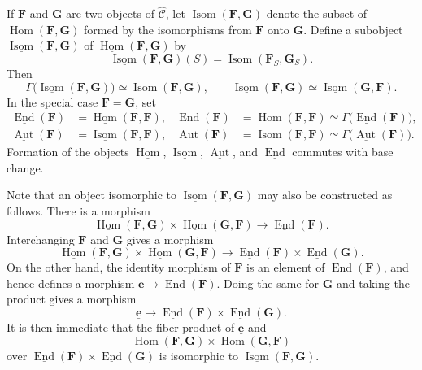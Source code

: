 If \(\mathbf F\) and \(\mathbf G\) are two objects of
\(\widehat{\mathscr C}\), let \(\operatorname{Isom}(\mathbf F,\mathbf G)\)
denote the subset of \(\operatorname{Hom}(\mathbf F,\mathbf G)\) formed by
the isomorphisms from \(\mathbf F\) onto \(\mathbf G\). Define a subobject
\(\underline{\operatorname{Isom}}(\mathbf F,\mathbf G)\) of
\(\underline{\operatorname{Hom}}(\mathbf F,\mathbf G)\) by
\[
  \underline{\operatorname{Isom}}(\mathbf F,\mathbf G)(S)
    =\operatorname{Isom}(\mathbf F_S,\mathbf G_S).
\]
Then
\[
  \Gamma\bigl(\underline{\operatorname{Isom}}
    (\mathbf F,\mathbf G)\bigr)
    \simeq\operatorname{Isom}(\mathbf F,\mathbf G),
  \qquad
  \underline{\operatorname{Isom}}(\mathbf F,\mathbf G)
    \simeq
  \underline{\operatorname{Isom}}(\mathbf G,\mathbf F).
\]
In the special case \(\mathbf F=\mathbf G\), set
\begin{align*}
  \underline{\operatorname{End}}(\mathbf F)
    &=\underline{\operatorname{Hom}}(\mathbf F,\mathbf F),
  &
  \operatorname{End}(\mathbf F)
    &=\operatorname{Hom}(\mathbf F,\mathbf F)
      \simeq\Gamma\bigl(\underline{\operatorname{End}}(\mathbf F)\bigr),\\
  \underline{\operatorname{Aut}}(\mathbf F)
    &=\underline{\operatorname{Isom}}(\mathbf F,\mathbf F),
  &
  \operatorname{Aut}(\mathbf F)
    &=\operatorname{Isom}(\mathbf F,\mathbf F)
      \simeq\Gamma\bigl(\underline{\operatorname{Aut}}(\mathbf F)\bigr).
\end{align*}
Formation of the objects
\(\underline{\operatorname{Hom}}\),
\(\underline{\operatorname{Isom}}\),
\(\underline{\operatorname{Aut}}\), and
\(\underline{\operatorname{End}}\) commutes with base change.

\medskip
\noindent{}Note that an object isomorphic to
\(\underline{\operatorname{Isom}}(\mathbf F,\mathbf G)\) may also be
constructed as follows. There is a morphism
\[
  \underline{\operatorname{Hom}}(\mathbf F,\mathbf G)
    \times
  \underline{\operatorname{Hom}}(\mathbf G,\mathbf F)
    \longrightarrow
  \underline{\operatorname{End}}(\mathbf F).
\]
Interchanging \(\mathbf F\) and \(\mathbf G\) gives a morphism
\[
  \underline{\operatorname{Hom}}(\mathbf F,\mathbf G)
    \times
  \underline{\operatorname{Hom}}(\mathbf G,\mathbf F)
    \longrightarrow
  \underline{\operatorname{End}}(\mathbf F)
    \times
  \underline{\operatorname{End}}(\mathbf G).
\]
On the other hand, the identity morphism of \(\mathbf F\) is an element of
\(\operatorname{End}(\mathbf F)\), and hence defines a morphism
\(\underline{\mathbf e}\to
\underline{\operatorname{End}}(\mathbf F)\). Doing the same for
\(\mathbf G\) and taking the product gives a morphism
\[
  \underline{\mathbf e}\longrightarrow
  \underline{\operatorname{End}}(\mathbf F)
    \times
  \underline{\operatorname{End}}(\mathbf G).
\]
It is then immediate that the fiber product of \(\underline{\mathbf e}\)
and
\[
  \underline{\operatorname{Hom}}(\mathbf F,\mathbf G)
    \times
  \underline{\operatorname{Hom}}(\mathbf G,\mathbf F)
\]
over
\(\underline{\operatorname{End}}(\mathbf F)
\times\underline{\operatorname{End}}(\mathbf G)\)
is isomorphic to
\(\underline{\operatorname{Isom}}(\mathbf F,\mathbf G)\).

